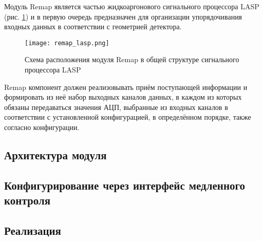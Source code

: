 Модуль Remap является частью жидкоаргонового сигнального процессора LASP (рис. \ref{fig:remap_lasp}) и в первую очередь предназначен для организации упорядочивания входных данных в соответствии с геометрией детектора.\par
\begin{figure}[ht]
    \centering
    \texttt{[image: remap\_lasp.png]}
    \caption{Схема расположения модуля Remap в общей структуре сигнального процессора LASP}
    \label{fig:remap_lasp}
\end{figure}\par
Remap компонент должен реализовывать приём поступающей информации и формировать из неё набор выходных каналов данных, в каждом из которых обязаны передаваться значения АЦП, выбранные из входных каналов в соответствии с установленной конфигурацией, в определённом порядке, также согласно конфигурации.\par

\subsection{Архитектура модуля}


\subsection{Конфигурирование через интерфейс медленного контроля}


\subsection{Реализация}

